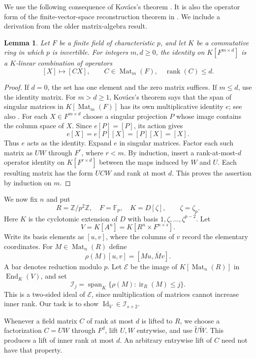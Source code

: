 \documentclass[11pt]{article}
\newtheorem{lemma}[theorem]{Lemma}
\theoremstyle{remark}\newtheorem{remark}[theorem]{Remark}
\newcommand{\F}{\mathbb F}
\newcommand{\Z}{\mathbb Z}
\newcommand{\Mat}{\operatorname{Mat}}
\newcommand{\rk}{\operatorname{rank}}
\newcommand{\ir}{\operatorname{ir}}
\newcommand{\Id}{\operatorname{Id}}
\begin{document}
We use the following consequence of Kov\'acs's theorem \cite{Ko}. It is also the operator form of the finite-vector-space reconstruction theorem in \cite[Theorem 49]{FKR}. We include a derivation from the older matrix-algebra result.

\begin{lemma}\label{lem:field}
Let $F$ be a finite field of characteristic $p$, and let $K$ be a commutative ring in which $p$ is invertible. For integers $m,d\ge0$, the identity on $K[F^{m\times d}]$ is a $K$-linear combination of operators
\[
 [X]\longmapsto[CX],\qquad C\in\Mat_m(F),\quad \rk(C)\le d.
\]
\end{lemma}
\begin{proof}
If $d=0$, the set has one element and the zero matrix suffices. If $m\le d$, use the identity matrix. For $m>d\ge1$, Kov\'acs's theorem says that the span of singular matrices in $K[\Mat_m(F)]$ has its own multiplicative identity $e$; see also \cite[Theorem 2.1]{Kuhn}. For each $X\in F^{m\times d}$ choose a singular projection $P$ whose image contains the column space of $X$. Since $e[P]=[P]$, its action gives
\[
 e[X]=e[P][X]=[P][X]=[X].
\]
Thus $e$ acts as the identity. Expand $e$ in singular matrices. Factor each such matrix as $UW$ through $F^r$, where $r<m$. By induction, insert a rank-at-most-$d$ operator identity on $K[F^{r\times d}]$ between the maps induced by $W$ and $U$. Each resulting matrix has the form $UCW$ and rank at most $d$. This proves the assertion by induction on $m$.
\end{proof}

We now fix $n$ and put
\[
 R=\Z/p^2\Z,\quad F=\F_p,\quad
 K=D[\zeta],\qquad \zeta=\zeta_p.
\]
Here $K$ is the cyclotomic extension of $D$ with basis
$1,\zeta,\ldots,\zeta^{p-2}$. Let
\[
 V=K[A^n]=K[R^n\times F^{n\times s}].
\]
Write its basis elements as $[u,v]$, where the columns of $v$ record the elementary coordinates. For $M\in\Mat_n(R)$ define
\begin{equation}\label{eq:rho}
 \rho(M)[u,v]=[Mu,\overline Mv].
\end{equation}
A bar denotes reduction modulo $p$. Let $\mathcal E$ be the image of $K[\Mat_n(R)]$ in $\operatorname{End}_K(V)$, and set
\[
 \mathcal I_j=\operatorname{span}_K\{\rho(M):\ir_R(M)\le j\}.
\]
This is a two-sided ideal of $\mathcal E$, since multiplication of matrices cannot increase inner rank. Our task is to show $\Id_V\in\mathcal I_{s+2}$.

Whenever a field matrix $C$ of rank at most $d$ is lifted to $R$, we choose a factorization $C=UW$ through $F^d$, lift $U,W$ entrywise, and use $\widetilde U\widetilde W$. This produces a lift of inner rank at most $d$. An arbitrary entrywise lift of $C$ need not have that property.
\end{document}
